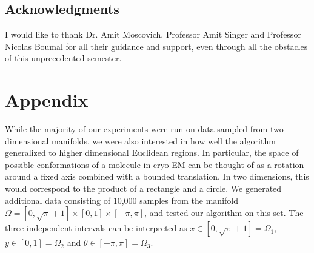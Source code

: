 \documentclass{article}
\numberwithin{equation}{section}
\theoremstyle{definition}
\begin{document}
\subsection*{Acknowledgments}
I would like to thank Dr. Amit Moscovich, Professor Amit Singer and Professor Nicolas Boumal for all their guidance and support, even through all the obstacles of this unprecedented semester.

\section{Appendix}
While the majority of our experiments were run on data sampled from two dimensional manifolds, we were also interested in how well the algorithm generalized to higher dimensional Euclidean regions. In particular, the space of possible conformations of a molecule in cryo-EM can be thought of as a rotation around a fixed axis combined with a bounded translation. In two dimensions, this would correspond to the product of a rectangle and a circle. We generated additional data consisting of 10,000 samples from the manifold $\Omega = [0, \sqrt{\pi} + 1] \times [0,1] \times [-\pi, \pi]$, and tested our algorithm on this set. The three independent intervals can be interpreted as $x \in [0, \sqrt{\pi} + 1] = \Omega_1$, $y \in [0,1] = \Omega_2$ and $\theta \in [-\pi, \pi] = \Omega_3$.
\end{document}
